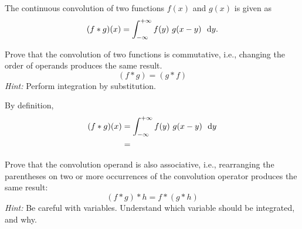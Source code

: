 \begin{problem}
  The continuous convolution of two functions $f(x)$ and $g(x)$
  is given as
  \[
    (f*g)(x) = \int_{-\infty}^{+\infty} f(y)\ g(x-y)\ \text{ d} y.
  \]

  \begin{enumroman}
    \item Prove that the convolution of two functions is commutative,
      i.e., changing the order of operands produces the same result.
      \[ (f \ast g) = (g \ast f) \]
      \textit{Hint:} Perform integration by substitution.

      \begin{answer}
        By definition,
        \begin{align*}
          (f \ast g)(x) &= \int_{-\infty}^{+\infty} f(y)\ g(x-y)\ \text{ d} y \\
                        &= 
        \end{align*}

      \end{answer}

    \item Prove that the convolution operand is also associative, i.e.,
      rearranging the parentheses on two or more occurrences of the convolution
      operator produces the same result:
      \[ (f \ast g) \ast h = f \ast (g \ast h) \]
      \textit{Hint:} Be careful with variables. Understand which variable should
      be integrated, and why.

      \begin{answer}

      \end{answer}
  \end{enumroman}
\end{problem}
